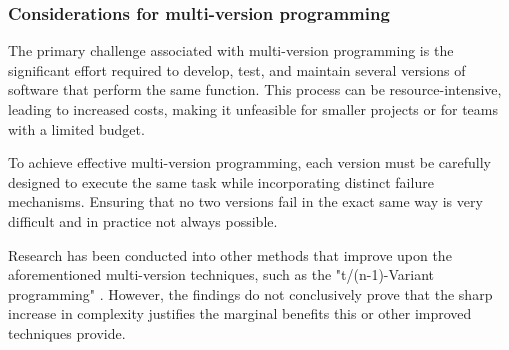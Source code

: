 \subsubsection{Considerations for multi-version programming}

The primary challenge associated with multi-version programming is the significant effort required to develop, test, and maintain several versions of software that perform the same function. This process can be resource-intensive, leading to increased costs, making it unfeasible for smaller projects or for teams with a limited budget.

To achieve effective multi-version programming, each version must be carefully designed to execute the same task while incorporating distinct failure mechanisms. Ensuring that no two versions fail in the exact same way is very difficult and in practice not always possible.

Research has been conducted into other methods that improve upon the aforementioned multi-version techniques, such as the "t/(n-1)-Variant programming" \cite{589928}. However, the findings do not conclusively prove that the sharp increase in complexity justifies the marginal benefits this or other improved techniques provide.
